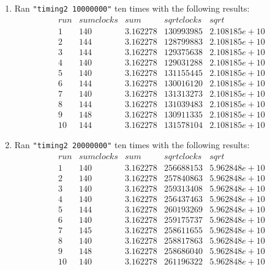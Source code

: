 \documentclass[12pt,fleqn,leqno,letterpaper]{article}
\begin{document}
\begin{enumerate}
    \item Ran \texttt{"timing2 10000000"} ten times with the following
        results:\\
        $$
        \begin{array}{lcccc}
            run & sum clocks & sum & sqrt clocks & sqrt \\
            1 & 140 & 3.162278 & 130993985 & 2.108185e+10 \\
            2 & 144 & 3.162278 & 128799883 & 2.108185e+10 \\
            3 & 144 & 3.162278 & 129375638 & 2.108185e+10 \\
            4 & 140 & 3.162278 & 129031288 & 2.108185e+10 \\
            5 & 140 & 3.162278 & 131155445 & 2.108185e+10 \\
            6 & 144 & 3.162278 & 130016120 & 2.108185e+10 \\
            7 & 140 & 3.162278 & 131313273 & 2.108185e+10 \\
            8 & 144 & 3.162278 & 131039483 & 2.108185e+10 \\
            9 & 148 & 3.162278 & 130911335 & 2.108185e+10 \\
            10 & 144 & 3.162278 & 131578104 & 2.108185e+10
        \end{array}
        $$

    \item Ran \texttt{"timing2 20000000"} ten times with the following
        results:\\
        $$
        \begin{array}{lcccc}
            run & sum clocks & sum & sqrt clocks & sqrt \\
            1 & 140 & 3.162278 & 256688153 & 5.962848e+10 \\
            2 & 140 & 3.162278 & 257840863 & 5.962848e+10 \\
            3 & 140 & 3.162278 & 259313408 & 5.962848e+10 \\
            4 & 140 & 3.162278 & 256437463 & 5.962848e+10 \\
            5 & 144 & 3.162278 & 260193269 & 5.962848e+10 \\
            6 & 140 & 3.162278 & 259175737 & 5.962848e+10 \\
            7 & 145 & 3.162278 & 258611655 & 5.962848e+10 \\
            8 & 140 & 3.162278 & 258817863 & 5.962848e+10 \\
            9 & 148 & 3.162278 & 258686040 & 5.962848e+10 \\
            10 & 140 & 3.162278 & 261196322 & 5.962848e+10
        \end{array}
        $$
\end{enumerate}


% 
\end{document}

